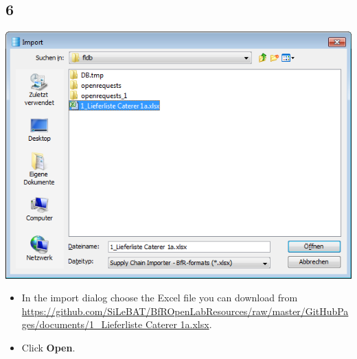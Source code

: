 \documentclass{beamer}
\begin{document}
\subsection{6}
\begin{frame}
	\begin{center}
  		\includegraphics[height=0.6\textheight]{6.png}
	\end{center}
	\begin{itemize}
		\item In the import dialog choose the Excel file you can download from  \url{https://github.com/SiLeBAT/BfROpenLabResources/raw/master/GitHubPages/documents/1_Lieferliste Caterer 1a.xlsx}.
		\item Click \textbf{Open}.
	\end{itemize}
\end{frame}
\end{document}

